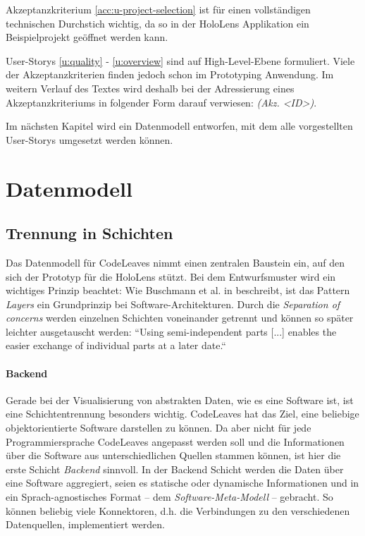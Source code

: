 Akzeptanzkriterium \ref{acc:u-project-selection} ist für einen vollständigen technischen Durchstich wichtig, da so in der HoloLens Applikation ein Beispielprojekt geöffnet werden kann.

User-Storys \ref{u:quality} - \ref{u:overview} sind auf High-Level-Ebene formuliert. Viele der Akzeptanzkriterien finden jedoch schon im Prototyping Anwendung. Im weitern Verlauf des Textes wird deshalb bei der Adressierung eines Akzeptanzkriteriums in folgender Form darauf verwiesen: \textit{(Akz. <ID>)}.

Im nächsten Kapitel wird ein Datenmodell entworfen, mit dem alle vorgestellten User-Storys umgesetzt werden können.

\chapter{Datenmodell}
\label{ch:data-model}
\section{Trennung in Schichten}
\label{ch:data-layers}

Das Datenmodell für CodeLeaves nimmt einen zentralen Baustein ein, auf den sich der Prototyp für die HoloLens stützt. Bei dem Entwurfsmuster wird ein wichtiges Prinzip beachtet: Wie Buschmann et al. in \cite{frank2007pattern} beschreibt, ist das Pattern \textit{Layers} ein Grundprinzip bei Software-Architekturen. Durch die \textit{Separation of concerns} werden einzelnen Schichten voneinander getrennt und können so später leichter ausgetauscht werden: ``Using semi-independent parts [...] enables the easier exchange of individual parts at a later date.`` \cite{frank2007pattern}

\subsubsection*{Backend}
Gerade bei der Visualisierung von abstrakten Daten, wie es eine Software ist, ist eine Schichtentrennung besonders wichtig. CodeLeaves hat das Ziel, eine beliebige objektorientierte Software darstellen zu können. Da aber nicht für jede Programmiersprache CodeLeaves angepasst werden soll und die Informationen über die Software aus unterschiedlichen Quellen stammen können, ist hier die erste Schicht \textit{Backend} sinnvoll. In der Backend Schicht werden die Daten über eine Software aggregiert, seien es statische oder dynamische Informationen und in ein Sprach-agnostisches Format -- dem \textit{Software-Meta-Modell} -- gebracht. So können beliebig viele Konnektoren, d.h. die Verbindungen zu den verschiedenen Datenquellen, implementiert werden.

